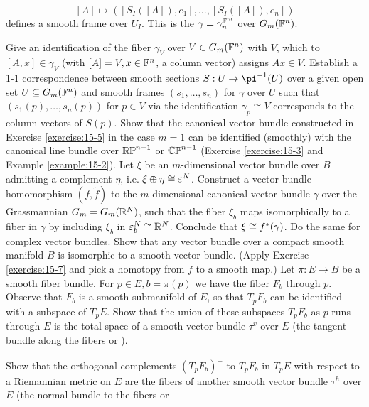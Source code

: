 \begin{enumerate}[\theexercise.1]
    \[
      [  A]   \mapsto  ( {[  {{S}_{I}( [  A]  ),{e}_{1}}] ,\ldots,[  {{S}_{I}( [  A]  ),{e}_{n}}]  })
    \]
    defines a smooth frame over ${U}_{I}$. This is the  $\gamma  = {\gamma }_{n}^{{\mathbb{F}}^{m}}$ over ${G}_{m}( {\mathbb{F}}^{n})$.\par
    Give an identification of the fiber ${\gamma }_{V}$ over $V \in  {G}_{m}( {\mathbb{F}}^{n})$ with $V$, which to $[  {A,x}]   \in  {\gamma }_{V}$ (with $[  A]   = V,x \in  {\ensuremath{\mathbb{F}}}^{n}$, a column vector) assigns ${Ax} \in  V$.
    Establish a 1-1 correspondence between smooth sections $S : U \ra  {\pi }^{-1}( U)$ over a given open set $U \subseteq  {G}_{m}( {\mathbb{F}}^{n})$ and smooth frames $( {{s}_{1},\ldots,{s}_{n}})$ for $\gamma$ over $U$ such that $( {{s}_{1}( p),\ldots,{s}_{n}( p) })$ for $p \in  V$ via the identification ${\gamma }_{p} \cong  V$ corresponds to the column vectors of $S( p)$.
  \NewItem Show that the canonical vector bundle constructed in Exercise \ref{exercise:15-5} in the case $m = 1$ can be identified (smoothly) with the canonical line bundle over ${\mathbb{{RP}}}^{n- 1}$ or ${\mathbb{{CP}}}^{n- 1}$ (Exercise \ref{exercise:15-3} and Example \ref{example:15-2}).
  \NewItem Let $\xi$ be an $m$-dimensional vector bundle over $B$ admitting a complement
    $\eta$, i.e. $\xi\oplus\eta\cong\varepsilon^N$. Construct a vector bundle homomorphism $(f, \tilde{f})$
    to the $m$-dimensional canonical vector bundle $\gamma$ over the Grassmannian $G_m = G_m({\mathbb{R}}^N)$, such that
    the fiber $\xi_b$ maps isomorphically to a fiber in $\gamma$ by including $\xi_b$ in $\varepsilon_b^N\cong{\ensuremath{\mathbb{R}}}^N$.
    Conclude that $\xi\cong f^*(\gamma)$. Do the same for complex vector bundles.
  \NewItem Show that any vector bundle over a compact smooth manifold $B$ is
    isomorphic to a smooth vector bundle. (Apply Exercise \ref{exercise:15-7} and pick a homotopy from $f$
    to a smooth map.)
  \NewItem Let $\pi:E\to B$ be a smooth fiber bundle. For $p\in E, b = \pi(p)$ we have
    the fiber $F_b$ through $p$. Observe that $F_b$ is a smooth submanifold of $E$, so
    that $T_pF_b$ can be identified with a subspace of $T_pE$. Show that the union
    of these subspaces $T_pF_b$ as $p$ runs through $E$ is the total space of a smooth
    vector bundle $\tau^v$ over $E$ (the tangent bundle along the fibers or
    ).\par
    Show that the orthogonal complements $(T_pF_b)^\perp$ to $T_pF_b$ in $T_pE$ with
    respect to a Riemannian metric on $E$ are the fibers of another smooth
    vector bundle $\tau^h$ over $E$ (the normal bundle to the fibers or

\end{enumerate}
